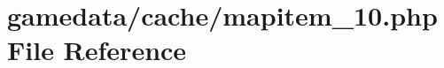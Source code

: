 \hypertarget{mapitem__10_8php}{\section{gamedata/cache/mapitem\+\_\+10.php File Reference}
\label{mapitem__10_8php}
}
